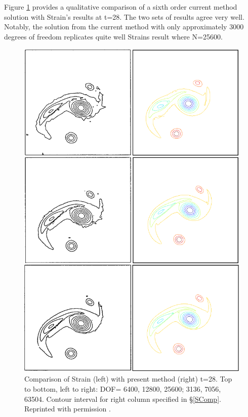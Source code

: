 \documentclass[letterpaper,12pt]{report}
\begin{document}
Figure \ref{fig:StrainComp} provides a qualitative comparison of a sixth order current method solution with Strain's results at t=28. The two sets of results agree very well. Notably, the solution from the current method with only approximately 3000 degrees of freedom replicates quite well Strains result where N=25600.
\begin{figure}
\centering
\includegraphics[width=1\textwidth]{StrainComp.PNG}
\caption{\label{fig:StrainComp}Comparison of Strain \cite{Strain1996} (left) with present method (right) t=28. Top to bottom, left to right: DOF= 6400, 12800, 25600; 3136, 7056, 63504. Contour interval for right column specified in \S\ref{SComp}. Reprinted with permission \cite{StrainLic}. }
\end{figure}
\end{document}
